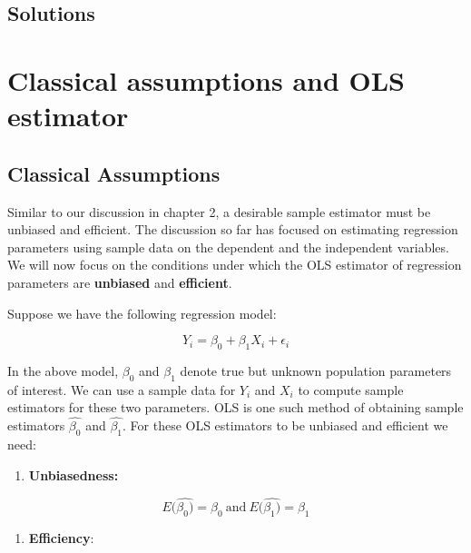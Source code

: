 \documentclass[
]{book}
\providecommand{\tightlist}{%
  \setlength{\itemsep}{0pt}\setlength{\parskip}{0pt}}
\theoremstyle{definition}
\theoremstyle{definition}
\theoremstyle{definition}
\theoremstyle{definition}
\theoremstyle{remark}
\begin{document}
\hypertarget{solutions-2}{%
\section*{Solutions}\label{solutions-2}}

\hypertarget{classical-assumptions-and-ols-estimator}{%
\chapter{Classical assumptions and OLS estimator}\label{classical-assumptions-and-ols-estimator}}

\hypertarget{classical-assumptions}{%
\section{Classical Assumptions}\label{classical-assumptions}}

Similar to our discussion in chapter 2, a desirable sample estimator must be unbiased and efficient. The discussion so far has focused on estimating regression parameters using sample data on the dependent and the independent variables. We will now focus on the conditions under which the OLS estimator of regression parameters are \textbf{unbiased} and \textbf{efficient}.

Suppose we have the following regression model:

\[Y_i = \beta_0 + \beta_1  X_i+ \epsilon_i\]

In the above model, \(\beta_0\) and \(\beta_1\) denote true but unknown population parameters of interest. We can use a sample data for \(Y_i\) and \(X_i\) to compute sample estimators for these two parameters. OLS is one such method of obtaining sample estimators \(\hat{\beta_0}\) and \(\hat{\beta_1}\). For these OLS estimators to be unbiased and efficient we need:

\begin{enumerate}
\def\labelenumi{\arabic{enumi}.}
\tightlist
\item
  \textbf{Unbiasedness:}
\end{enumerate}

\[E(\hat{\beta_0)}=\beta_0 \ \text{and} \ E(\hat{\beta_1)}=\beta_1\]

\begin{enumerate}
\def\labelenumi{\arabic{enumi}.}
\setcounter{enumi}{1}
\tightlist
\item
  \textbf{Efficiency}:
\end{enumerate}
\end{document}
